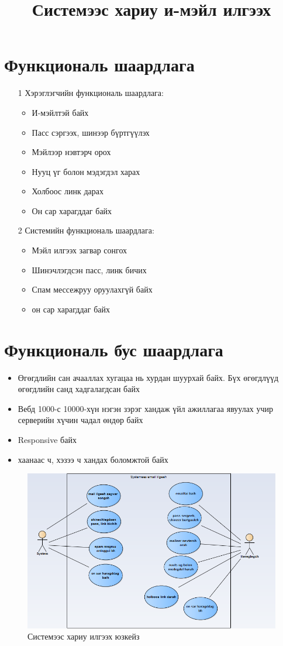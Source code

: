 \documentclass[12pt]{article}
\title{Системээс хариу и-мэйл илгээх}
\begin{document}
	\section{Функциональ шаардлага}
	
	\begin{enumerate}
		\item[1] Хэрэглэгчийн функциональ шаардлага:
		\begin{itemize}
			\item И-мэйлтэй байх 
			\item Пасс сэргээх, шинээр бүртгүүлэх
			\item Мэйлээр нэвтэрч орох
			\item Нууц үг болон мэдэгдэл харах
			\item Холбоос линк дарах
			\item Он сар харагддаг байх
		\end{itemize}
	\end{enumerate}
	\begin{enumerate}
		\item[2] Системийн функциональ шаардлага:
		\begin{itemize}
			\item Мэйл илгээх загвар сонгох 
			\item Шинэчлэгдсэн пасс, линк бичих
			\item Спам мессежруу оруулахгүй байх
			\item он сар харагддаг байх
		\end{itemize}
	\end{enumerate}
	\section{Функциональ бус шаардлага}
	\begin{itemize}
		\item Өгөгдлийн сан ачааллах хугацаа нь хурдан шуурхай байх. Бүх өгөгдлүүд өгөгдлийн санд хадгалагдсан байх
		\item Вебд 1000-с 10000-хүн нэгэн зэрэг хандаж үйл ажиллагаа явуулах учир серверийн хүчин чадал өндөр байх
		\item Responsive байх
		\item хаанаас ч, хэзээ ч хандах боломжтой байх
	\end{itemize}
\begin{figure}[ht]
	\includegraphics[width=1\linewidth]{images/email_usecase}
	\caption[Юзкейз]{Системээс хариу илгээх юзкейз}
	\label{fig:emailusecase}
\end{figure}
\end{document}
